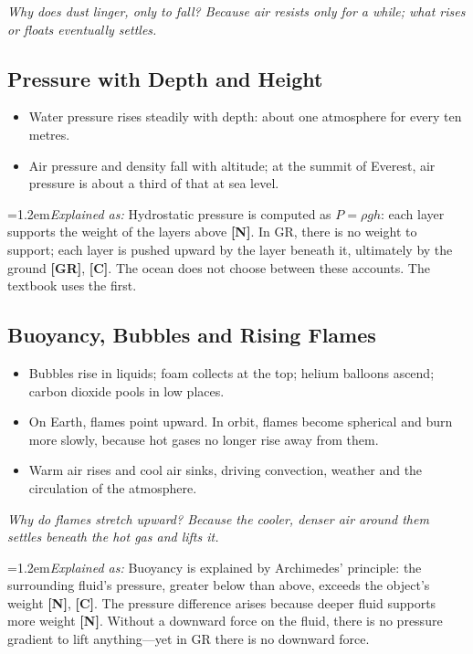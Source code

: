 \documentclass[11pt,a4paper]{article}
\newcommand{\reg}[1]{\textsf{\small\textbf{[#1]}}}
\newcommand{\RN}{\reg{N}}
\newcommand{\RGR}{\reg{GR}}
\newcommand{\RC}{\reg{C}}
\newcommand{\expl}[1]{\par\begingroup\leftskip=1.2em\small\noindent\textit{Explained as:} #1\par\endgroup\smallskip}%
\newcommand{\why}[1]{\par\textit{#1}\par}
\begin{document}
\why{Why does dust linger, only to fall? Because air resists only for a while; what rises or floats eventually settles.}

\subsection{Pressure with Depth and Height}

\begin{itemize}
  \item Water pressure rises steadily with depth: about one atmosphere for every ten metres.
  \item Air pressure and density fall with altitude; at the summit of Everest, air pressure is about a third of that at sea level.
\end{itemize}

\expl{Hydrostatic pressure is computed as $P = \rho g h$: each layer supports the weight of the layers above \RN{}. In GR, there is no weight to support; each layer is pushed upward by the layer beneath it, ultimately by the ground \RGR{}, \RC{}. The ocean does not choose between these accounts. The textbook uses the first.}

\subsection{Buoyancy, Bubbles and Rising Flames}

\begin{itemize}
  \item Bubbles rise in liquids; foam collects at the top; helium balloons ascend; carbon dioxide pools in low places.
  \item On Earth, flames point upward. In orbit, flames become spherical and burn more slowly, because hot gases no longer rise away from them.
  \item Warm air rises and cool air sinks, driving convection, weather and the circulation of the atmosphere.
\end{itemize}

\why{Why do flames stretch upward? Because the cooler, denser air around them settles beneath the hot gas and lifts it.}

\expl{Buoyancy is explained by Archimedes' principle: the surrounding fluid's pressure, greater below than above, exceeds the object's weight \RN{}, \RC{}. The pressure difference arises because deeper fluid supports more weight \RN{}. Without a downward force on the fluid, there is no pressure gradient to lift anything---yet in GR there is no downward force.}
\end{document}
